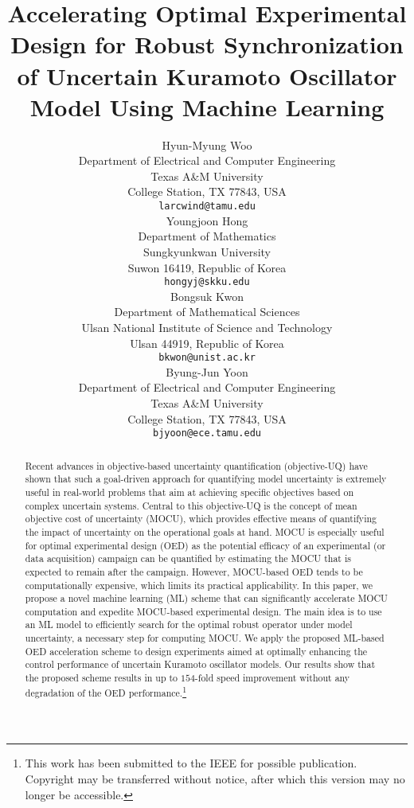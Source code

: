 \documentclass{article}
\title{Accelerating Optimal Experimental Design for Robust Synchronization of Uncertain Kuramoto Oscillator Model Using Machine Learning}
\author{
 Hyun-Myung Woo\\
  Department of Electrical and Computer Engineering\\
  Texas A\&M University\\
  College Station, TX 77843, USA\\
  \texttt{larcwind@tamu.edu}\\
  \And
 Youngjoon Hong\\
  Department of Mathematics\\
  Sungkyunkwan University\\
  Suwon 16419, Republic of Korea\\
  \texttt{hongyj@skku.edu}\\
  \And
 Bongsuk Kwon\\
  Department of Mathematical Sciences\\
  Ulsan National Institute of Science and Technology\\
  Ulsan 44919, Republic of Korea\\
  \texttt{bkwon@unist.ac.kr}\\
  \And 
  Byung-Jun Yoon\\
  Department of Electrical and Computer Engineering\\
  Texas A\&M University\\
  College Station, TX 77843, USA\\
  \texttt{bjyoon@ece.tamu.edu}\\
}
\begin{document}
\maketitle
\begin{abstract}
Recent advances in objective-based uncertainty quantification (objective-UQ) have shown that such a goal-driven approach for quantifying model uncertainty is extremely useful in real-world problems that aim at achieving specific objectives based on complex uncertain systems. Central to this objective-UQ is the concept of mean objective cost of uncertainty (MOCU), which provides effective means of quantifying the impact of uncertainty on the operational goals at hand. MOCU is especially useful for optimal experimental design (OED) as the potential efficacy of an experimental (or data acquisition) campaign can be quantified by estimating the MOCU that is expected to remain after the campaign. However, MOCU-based OED tends to be computationally expensive, which limits its practical applicability. In this paper, we propose a novel machine learning (ML) scheme that can significantly accelerate MOCU computation and expedite MOCU-based experimental design. The main idea is to use an ML model to efficiently search for the optimal robust operator under model uncertainty, a necessary step for computing MOCU. We apply the proposed ML-based OED acceleration scheme to design experiments aimed at optimally enhancing the control performance of uncertain Kuramoto oscillator models. Our results show that the proposed scheme results in up to ${154}$-fold speed improvement without any degradation of the OED performance.\footnote{This work has been submitted to the IEEE for possible publication. Copyright may be transferred without notice, after which this version may no longer be accessible.}
\end{abstract}


\end{document}
